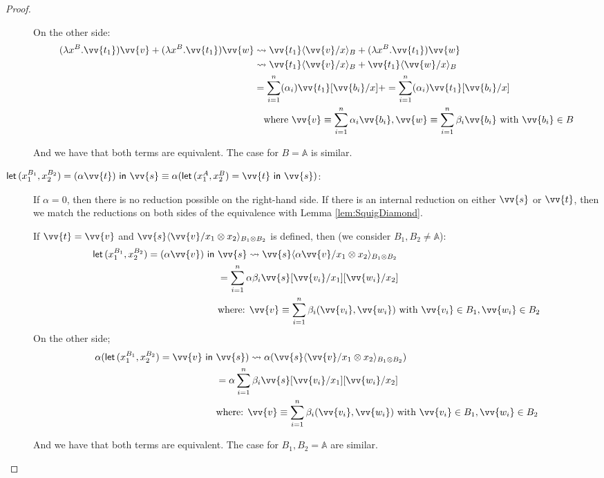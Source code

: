 \documentclass[runningheads,orivec,envcountsame,envcountsect]{llncs}
\newcommand\ansubst[2]{\ensuremath{\langle #1 \rangle_{#2}}}
\newcommand\AbsBasis{\ensuremath{\mathbb{A}}}
\def\Pair#1#2{(#1,#2)} %
\def\Lam#1#2#3{\lambda#1^{#2}{.}#3} %
\def\letkeyword{\mathsf{let}}
\def\inkeyword{\mathsf{in}}
\def\LetP#1#2#3#4#5#6{\letkeyword\,\Pair{#1^{#2}}{#3^{#4}}=#5~\inkeyword~#6}
\def\lraneq{\rightsquigarrow}
\begin{document}
\begin{proof}
\begin{description}
    On the other side:
    \begin{align*}
      (\Lam{x}{B}{\vv{t_1}}) \vv{v} + (\Lam{x}{B}{\vv{t_1}}) \vv{w} &\lraneq \vv{t_1}\ansubst{\vv{v}/x}{B} + (\Lam{x}{B}{\vv{t_1}}) \vv{w}\\
      &\lraneq \vv{t_1}\ansubst{\vv{v}/x}{B} + \vv{t_1}\ansubst{\vv{w}/x}{B}\\
      &=\sum_{i=1}^{n}(\alpha_i)\vv{t_1}[\vv{b_i}/x] + =\sum_{i=1}^{n}(\alpha_i)\vv{t_1}[\vv{b_i}/x]\\
      &\quad\text{where }\vv{v}\equiv\sum_{i=1}^{n}\alpha_i\vv{b_i},\vv{w}\equiv\sum_{i=1}^{n}\beta_i\vv{b_i}\text{ with }\vv{b_i}\in B 
    \end{align*}

    And we have that both terms are equivalent. The case for $B=\AbsBasis$ is similar.

    \item[$\LetP{x_1}{B_1}{x_2}{B_2}{(\alpha \vv{t})}{\vv{s}}\equiv\alpha(\LetP{x_1}{A}{x_2}{B}{\vv{t}}{\vv{s}})$:] If $\alpha=0$, then there is no reduction possible on the right-hand side. If there is an internal reduction on either $\vv{s}$ or $\vv{t}$, then we match the reductions on both sides of the equivalence with Lemma \ref{lem:SquigDiamond}.
    
    If $\vv{t}=\vv{v}$ and $\vv{s}\ansubst{\vv{v}/x_1\otimes x_2}{B_1\otimes B_2}$ is defined, then (we consider $B_1,B_2\neq\AbsBasis$):
    \begin{align*}
    \LetP{x_1}{B_1}{x_2}{B_2}{(\alpha \vv{v})}{&\vv{s}}\lraneq \vv{s}\ansubst{\alpha\vv{v}/x_1\otimes x_2}{B_1\otimes B_2}\\
    &=\sum_{i=1}^{n}\alpha\beta_i \vv{s}[\vv{v_i}/x_1][\vv{w_i}/x_2]\\ 
    &\text{where: }\vv{v}\equiv\sum_{i=1}^n\beta_i\Pair{\vv{v_i}}{\vv{w_i}} \text{ with } \vv{v_i}\in B_1, \vv{w_i}\in B_2
    \end{align*}
    On the other side;
    \begin{align*}
    \alpha(\LetP{x_1}{B_1}{x_2}{B_2}{\vv{v}}{&\vv{s}})\lraneq \alpha(\vv{s}\ansubst{\vv{v}/x_1\otimes x_2}{B_1\otimes B_2})\\
    &=\alpha\sum_{i=1}^{n}\beta_i \vv{s}[\vv{v_i}/x_1][\vv{w_i}/x_2]\\ 
    &\text{where: } \vv{v}\equiv\sum_{i=1}^n\beta_i\Pair{\vv{v_i}}{\vv{w_i}} \text{ with } \vv{v_i}\in B_1, \vv{w_i}\in B_2
    \end{align*}

    And we have that both terms are equivalent. The case for $B_1,B_2=\AbsBasis$ are similar.


\end{description}
\end{proof}
\end{document}
